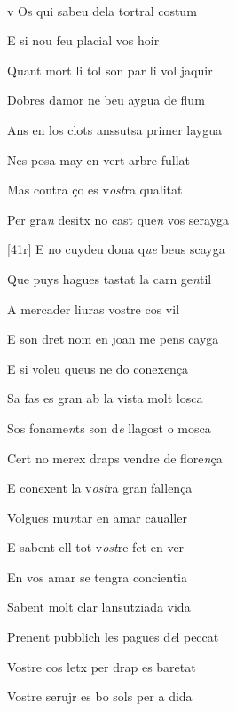 \documentclass[12pt]{article}
\renewcommand{\espaiAbansEtiquetaPoema}{\vspace{0ex}}
\begin{document}
\begin{estrofa}

\espaiAbansEtiquetaPoema

\\

\end{estrofa}


\begin{estrofa}

 v Os qui sabeu dela tortral costum

 E si nou feu placial vos hoir

 Quant mort li tol son par li vol jaquir

 Dobres damor ne beu aygua de flum

 Ans en los clots anssutsa primer laygua

 Nes posa may en vert arbre fullat

 Mas contra \c{c}o es v\textit{ost}ra qualitat

 Per gra\textit{n} desitx no cast que\textit{n} vos serayga

\end{estrofa}



\begin{estrofa}

 [41r] E no cuydeu dona q\textit{ue} beus scayga

 Que puys hagues tastat la carn ge\textit{n}til

 A mercader liuras vostre cos vil

 E son dret nom en joan me pens cayga

 E si voleu queus ne do conexen\c{c}a

 Sa fas es gran ab la vista molt losca

 Sos foname\textit{n}ts son d\textit{e} llagost o mosca

 Cert no merex draps vendre de flore\textit{n}\c{c}a

\end{estrofa}



\begin{estrofa}

 E conexent la v\textit{ost}ra gran fallen\c{c}a

 Volgues mu\textit{n}tar en amar caualler

 E sabent ell tot v\textit{ost}re fet en ver

 En vos amar se tengra concientia

 Sabent molt clar lansutziada vida

 Prenent pubblich les pagues d\textit{e}l peccat

 Vostre cos letx per drap es baretat

 Vostre serujr es bo sols per a dida

\end{estrofa}
\end{document}
